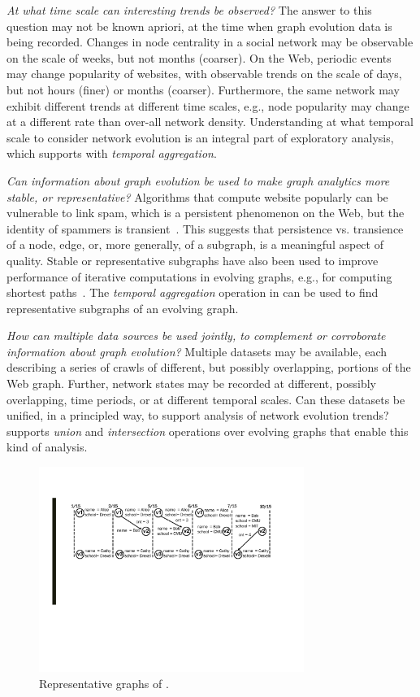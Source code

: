 {\em At what time scale can interesting trends be observed?} The
answer to this question may not be known apriori, at the time when
graph evolution data is being recorded.  Changes in node centrality in
a social network may be observable on the scale of weeks, but not
months (coarser).  On the Web, periodic events may change popularity
of websites, with observable trends on the scale of days, but not
hours (finer) or months (coarser).  Furthermore, the same network may
exhibit different trends at different time scales, e.g., node
popularity may change at a different rate than over-all network
density.  Understanding at what temporal scale to consider network
evolution is an integral part of exploratory analysis, which \ql
supports with {\em temporal aggregation}.

{\em Can information about graph evolution be used to make graph
  analytics more stable, or representative?}  Algorithms that compute
website popularly can be vulnerable to link spam, which is a
persistent phenomenon on the Web, but the identity of spammers is
transient~\cite{DBLP:conf/cikm/YangQZGL07}.  This suggests that
persistence vs. transience of a node, edge, or, more generally, of a
subgraph, is a meaningful aspect of quality.  Stable or representative
subgraphs have also been used to improve performance of iterative
computations in evolving graphs, e.g., for computing shortest
paths~\cite{Ren2011}.  The {\em temporal aggregation} operation in \ql
{}can be used to find
representative subgraphs of an evolving graph.

{\em How can multiple data sources be used jointly, to complement or
  corroborate information about graph evolution?}  Multiple datasets may be available, each describing a
series of crawls of different, but possibly overlapping, portions of
the Web graph.  Further, network states may be recorded at different,
possibly overlapping, time periods, or at different temporal scales.
Can these datasets be unified, in a principled way, to support
analysis of network evolution trends?  \ql
supports {\em union} and {\em intersection} operations over evolving
graphs that enable this kind of analysis.

\begin{figure}[t!]
\includegraphics[width=3.4in]{figs/T1_graphs.pdf}
\vspace{-0.5cm}
\caption{Representative graphs of \tg {}.}
\vspace{-0.4cm}
\label{fig:tg_rg}
\end{figure}

